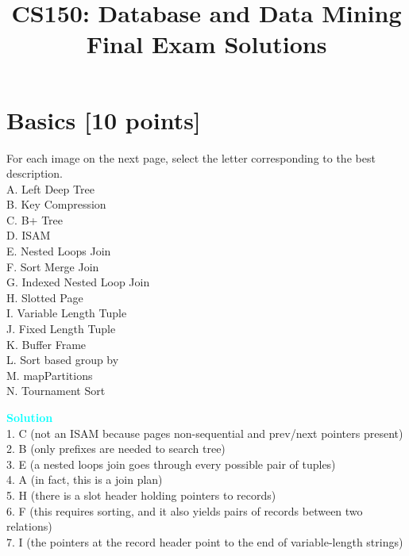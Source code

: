 \documentclass[10pt]{article}
\newenvironment{solution}
    { \begin{mdframed}[backgroundcolor=gray!10] \textcolor{cyan}{\textbf{Solution}} \\}
    {  \end{mdframed}}
\begin{document}
\title{CS150: Database and Data Mining \\%
	Final Exam Solutions}
\maketitle


\section{Basics \textbf{[10 points]}}
For each image on the next page, select the letter corresponding to the best description. \\
A. Left Deep Tree \\
B. Key Compression \\
C. B+ Tree \\
D. ISAM \\
E. Nested Loops Join \\
F. Sort Merge Join \\
G. Indexed Nested Loop Join \\
H. Slotted Page \\
I. Variable Length Tuple \\
J. Fixed Length Tuple \\
K. Buffer Frame \\
L. Sort based group by \\
M. mapPartitions \\
N. Tournament Sort \\
\begin{solution}
	1. C (not an ISAM because pages non-sequential and prev/next pointers present) \\
	2. B (only prefixes are needed to search tree) \\
	3. E (a nested loops join goes through every possible pair of tuples) \\
	4. A (in fact, this is a join plan) \\
	5. H (there is a slot header holding pointers to records) \\
	6. F (this requires sorting, and it also yields pairs of records between two relations) \\
	7. I (the pointers at the record header point to the end of variable-length strings)
\end{solution}
\end{document}
